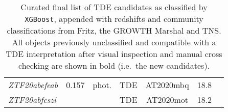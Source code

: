 \begin{table*}
\begin{tabular}{l  c  c  c   c  c  c}
    \textit{ZTF20abefeab}          & 0.157          & phot.          & TDE                     & AT2020mbq           & 18.8                       &                                     \\
    \textit{ZTF20abfcszi}          & ~              & ~              & TDE                     & AT2020mot           & 18.2                       &                                     \\
  \end{tabular}
  \caption[Final TDE (candidates)]{Curated final list of TDE candidates as classified by \texttt{XGBoost}, appended with redshifts and community classifications from Fritz, the GROWTH Marshal and TNS. All objects previously unclassified and compatible with a TDE interpretation after visual inspection and manual cross checking are shown in bold (i.e.~the new candidates).}
  \label{tab:tde_candidates}
\end{table*}

